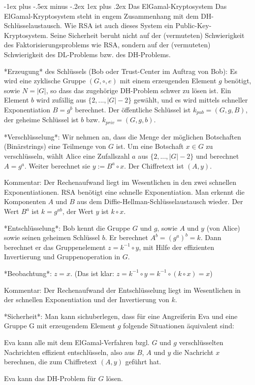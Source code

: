 \documentclass[a4paper]{article}
\makeatletter
\renewcommand{\subsubsection}{\@startsection{subsubsection}{3}{0mm}%
 {-1ex plus -.5ex minus -.2ex}%
 {1ex plus .2ex}%
 {\normalfont\small\bfseries}}
\makeatother
\begin{document}
\begin{multicols}{3}
        \subsubsection{Das ElGamal-Kryptosystem}
        Das ElGamal-Kryptosystem steht in engem Zusammenhang mit dem DH-Schlüsselaustausch. Wie RSA ist auch dieses System ein Public-Key-Kryptosystem. Seine Sicherheit beruht nicht auf der (vermuteten) Schwierigkeit des Faktorisierungsproblems wie RSA, sondern auf der (vermuteten) Schwierigkeit des DL-Problems bzw. des DH-Problems.

        *Erzeugung* des Schlüssels (Bob oder Trust-Center im Auftrag von Bob): Es wird eine zyklische Gruppe $(G,\circ,e)$ mit einem erzeugenden Element $g$ benötigt, sowie $N=|G|$, so dass das zugehörige DH-Problem schwer zu lösen ist. Ein Element $b$ wird zufällig aus $\{2 ,...,|G|-2\}$ gewählt, und es wird mittels schneller Exponentiation $B=g^b$ berechnet. Der öffentliche Schlüssel ist $k_{pub}= (G,g,B)$, der geheime Schlüssel ist $b$ bzw. $k_{priv}=(G,g,b)$.

        *Verschlüsselung*: Wir nehmen an, dass die Menge der möglichen Botschaften (Binärstrings) eine Teilmenge von $G$ ist. Um eine Botschaft $x\in G$ zu verschlüsseln, wählt Alice eine Zufallszahl $a$ aus $\{2,...,|G|-2\}$ und berechnet $A=g^a$. Weiter berechnet sie $y:=B^a \circ x$. Der Chiffretext ist $(A,y)$.

        Kommentar: Der Rechenaufwand liegt im Wesentlichen in den zwei schnellen Exponentiationen. RSA benötigt eine schnelle Exponentiation. Man erkennt die Komponenten $A$ und $B$ aus dem Diffie-Hellman-Schlüsselaustausch wieder. Der Wert $B^a$ ist $k=g^{ab}$, der Wert $y$ ist $k\circ x$.

        *Entschlüsselung*: Bob kennt die Gruppe $G$ und $g$, sowie $A$ und $y$ (von Alice) sowie seinen geheimen Schlüssel $b$. Er berechnet $A^b= (g^a)^b=k$. Dann berechnet er das Gruppenelement $z=k^{-1}\circ y$, mit Hilfe der effizienten Invertierung und Gruppenoperation in $G$.

        *Beobachtung*: $z=x$. (Das ist klar: $z=k^{-1}\circ y=k^{-1}\circ(k\circ x) =x$)

        Kommentar: Der Rechenaufwand der Entschlüsselung liegt im Wesentlichen in der schnellen Exponentiation und der Invertierung von $k$.

        *Sicherheit*: Man kann sichuberlegen, dass für eine Angreiferin Eva und eine Gruppe G mit erzeugendem Element $g$ folgende Situationen äquivalent sind:
        \begin{enumerate*}
            \item  Eva kann alle mit dem ElGamal-Verfahren bzgl. $G$ und $g$ verschlüsselten Nachrichten effizient entschlüsseln, also aus $B$, $A$ und $y$ die Nachricht $x$ berechnen, die zum Chiffretext $(A,y)$ geführt hat.
            \item Eva kann das DH-Problem für $G$ lösen.
        \end{enumerate*}


\end{multicols}
\end{document}
